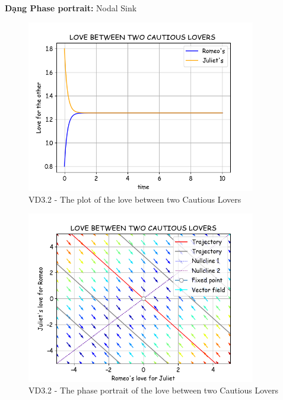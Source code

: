 \textbf{Dạng Phase portrait: } Nodal Sink
\pagebreak
\begin{figure}[!htbp]
    \centering
    \includegraphics[width=100mm]{image/bt2/plot3.2.png}
    \caption{VD3.2 - The plot of the love between two Cautious Lovers}
\end{figure}
\begin{figure}[!htbp]
    \centering
    \includegraphics[width=100mm]{image/bt2/pp3.2.png}
    \caption{VD3.2 - The phase portrait of the love between two Cautious Lovers}
\end{figure}

